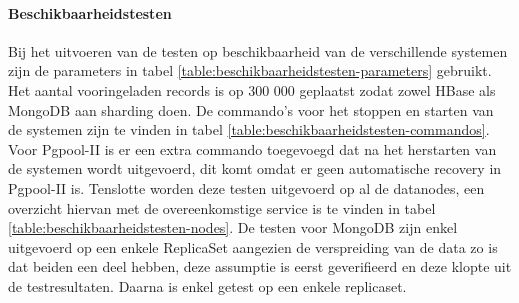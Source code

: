 \paragraph{Beschikbaarheidstesten} Bij het uitvoeren van de testen op beschikbaarheid van de verschillende systemen zijn de parameters in tabel \ref{table:beschikbaarheidstesten-parameters} gebruikt. Het aantal vooringeladen records is op 300 000 geplaatst zodat zowel HBase als MongoDB aan sharding doen. De commando's voor het stoppen en starten van de systemen zijn te vinden in tabel \ref{table:beschikbaarheidstesten-commandos}.  Voor Pgpool-II is er een extra commando toegevoegd dat na het herstarten van de systemen wordt uitgevoerd, dit komt omdat er geen automatische recovery in Pgpool-II is. Tenslotte worden deze testen uitgevoerd op al de datanodes, een overzicht hiervan met de overeenkomstige service is te vinden in tabel \ref{table:beschikbaarheidstesten-nodes}. De testen voor MongoDB zijn enkel uitgevoerd op een enkele ReplicaSet aangezien de verspreiding van de data zo is dat beiden een deel hebben, deze assumptie is eerst geverifieerd en deze klopte uit de testresultaten. Daarna is enkel getest op een enkele replicaset. 

